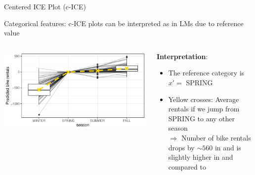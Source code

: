 \documentclass[11pt,compress,t,notes=noshow, aspectratio=169, xcolor=table]{beamer}
\begin{document}
\begin{frame}{Centered ICE Plot (c-ICE)}

Categorical features: c-ICE plots can be interpreted as in LMs due to reference value

\begin{columns}[c, totalwidth=\textwidth]
\begin{column}{0.44\textwidth}

\begin{center}
\includegraphics[width=\textwidth]{figure/cICEcat}
\end{center}

\end{column}
\begin{column}{0.55\textwidth}

\textbf{Interpretation}: \\
\begin{itemize}
\item The reference category is $x' =$ SPRING
\item Yellow crosses: Average rentals if we jump from SPRING to any other season\\
$\Rightarrow$ Number of bike rentals drops by $\sim 560$ in  and is slightly higher in  and  compared to 
\end{itemize}

\end{column}
\end{columns}

\end{frame}


\endlecture
\end{document}
